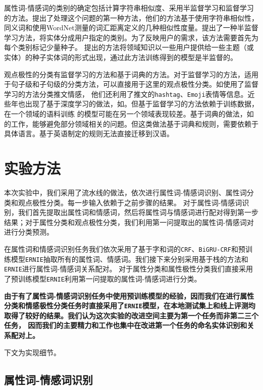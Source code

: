 \documentclass[11pt,a4paper]{article}
\begin{document}
属性词-情感词的类别的确定包括计算字符串相似度、采用半监督学习和监督学习的方法。\cite{carenini2005extracting}提出了处理这个问题的第一种方法，他们的方法基于使用字符串相似性，
同义词和使用WordNet测量的词汇距离定义的几种相似性度量。\cite{zhai2010grouping}提出了一种半监督学习方法，将实体分成用户指定的类别。为了反映用户的需求，该方法需要首先为每个类别标记少量种子。
\cite{mukherjee2012aspect}提出的方法将领域知识以一些用户提供给一些主题（或实体）的种子实体词的形式出现，通过此方法训练得到的模型是半监督的。

观点极性的分类有监督学习的方法和基于词典的方法。对于监督学习的方法，适用于句子级和子句级的分类方法，可以直接用于这里的观点极性分类。如\cite{davidov2010enhanced}使用了监督学习的方法分类推文情感，
他们还利用了推文的\texttt{hashtag}、\texttt{Emoji}表情等信息。近些年也出现了基于深度学习的做法，如\cite{tang-etal-2014-coooolll}。但基于监督学习的方法依赖于训练数据，在一个领域的语料训练
的模型可能在另一个领域表现较差。基于词典的做法，如\cite{hu2004mining}的工作，能够避免部分领域相关的问题。但这类做法基于词典和规则，需要依赖于具体语言。基于英语制定的规则无法直接迁移到汉语。


\section{实验方法}
本次实验中，我们采用了流水线的做法，依次进行属性词-情感词识别、属性词分类和观点极性分类。每一步输入依赖于之前步骤的结果。
对于属性词-情感词识别，我们首先提取出属性词和情感词，然后将属性词与情感词进行配对得到第一步结果；对于属性分类和观点极性分类，我们利用第一问提取出的属性词-情感词对进行分类预测。

在属性词和情感词识别任务我们依次采用了基于字和词的\texttt{CRF}、\texttt{BiGRU-CRF}和预训练模型\texttt{ERNIE}抽取所有的属性词、情感词。我们接下来分别采用基于栈的方法和\texttt{ERNIE}进行属性词-情感词关系配对。
对于属性分类和属性极性分类我们直接采用了预训练模型\texttt{ERNIE}利用第一问提取的属性词-情感词进行分类。

\textbf{由于有了属性词-情感词识别任务中使用预训练模型的经验，因而我们在进行属性分类和情感极性分类任务时直接采用了\texttt{ERNIE}模型，在本地测试集上和线上评测均取得了较好的结果。我们认为这次实验的改进空间主要为第一个任务而非第二三个任务，
因而我们的主要精力和工作也集中在改进第一个任务的命名实体识别和关系配对上。}

下文为实现细节。

\subsection{属性词-情感词识别}
\end{document}
